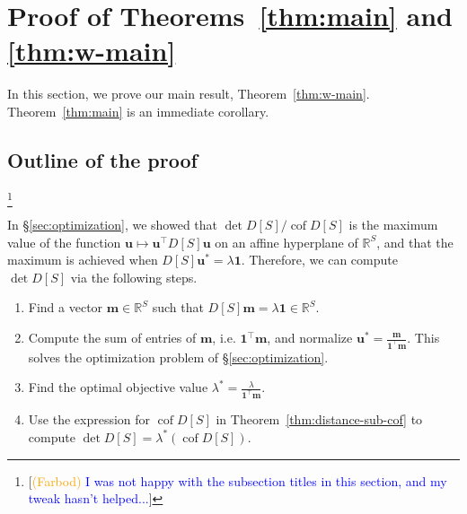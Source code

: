 \documentclass[12pt]{amsart}
\theoremstyle{definition}
\newcommand{\RR}{\mathbb{R}}
\newcommand{\bone}{\mathbf{1}}
\newcommand{\boldm}{\mathbf{m}}
\newcommand{\boldu}{\mathbf{u}}
\newcommand{\tr}{\intercal}
\DeclareMathOperator{\cof}{cof}
\newcommand\farbod[1]{\footnote{[\textcolor{orange}{(Farbod)} \textcolor{blue}{#1}]}}
\begin{document}
\section{Proof of Theorems~\ref{thm:main} and \ref{thm:w-main}}
\label{sec:distance_proofs}
In this section, we prove our main result, Theorem~\ref{thm:w-main}.
Theorem~\ref{thm:main} is an immediate corollary.

\subsection{Outline of the proof}\farbod{I was not happy with the subsection titles in this section, and my tweak hasn't helped...} 

In \S\ref{sec:optimization}, we showed that ${\det D[S]}/{\cof D[S]}$ is the maximum value of the function $\boldu \mapsto \boldu^\tr D[S] \boldu$ on an affine hyperplane of $\RR^S$,
and that the maximum is achieved when $D[S] \boldu^* = \lambda \bone$.
Therefore, we can compute $\det D[S]$ via the following steps.

\begin{enumerate}[label=(\roman*)]
\item 
Find a vector $\boldm \in \RR^S$ such that $D[S]\boldm = \lambda \mathbf{1} \in \RR^S$.

\item 
Compute the sum of entries of $\boldm$, i.e. $\mathbf{1}^\tr \boldm$, and normalize
$\displaystyle
	\boldu^* = \frac{\boldm}{\bone^\tr \boldm}.
$
This solves the optimization problem of \S\ref{sec:optimization}.

\item 
Find the optimal objective value
$\displaystyle
	\lambda^* = \frac{\lambda}{\bone^\tr \boldm}.
$


\item
Use the expression for $\cof D[S]$ in Theorem~\ref{thm:distance-sub-cof} to compute $\det D[S] = \lambda^* (\cof D[S])$.
\end{enumerate}
\end{document}
